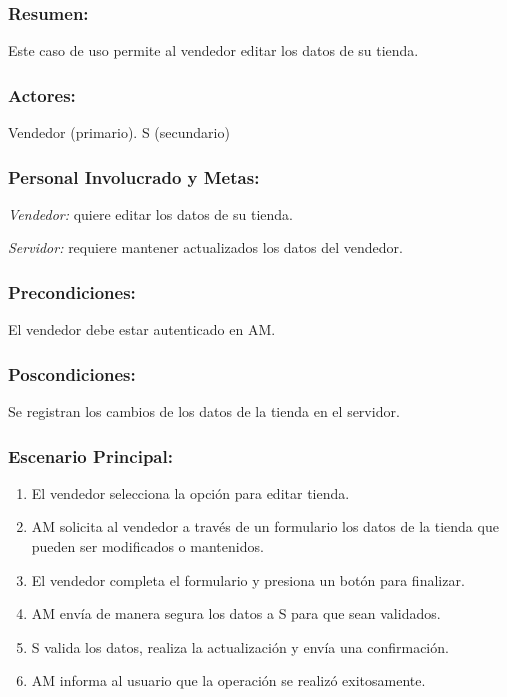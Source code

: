 \begin{framed}


\subsubsection{Resumen:} Este caso de uso permite al vendedor editar los datos de su tienda.


\subsubsection{Actores:} Vendedor (primario). S (secundario)

\subsubsection{Personal Involucrado y Metas:}

\emph{Vendedor:} quiere editar los datos de su tienda.

\emph{Servidor:} requiere mantener actualizados los datos del vendedor.

\subsubsection{Precondiciones:} 
El vendedor debe estar autenticado en AM. 

\subsubsection{Poscondiciones:} 
Se registran los cambios de los datos de la tienda en el servidor.

\subsubsection{Escenario Principal: }

\begin{enumerate}
    \item El vendedor selecciona la opción para editar tienda. 
    \item AM solicita al vendedor a través de un formulario los datos de la tienda que pueden ser modificados o mantenidos.
    \item El vendedor completa el formulario y presiona un botón para finalizar.
    \item AM envía de manera segura los datos a S para que sean validados.
    \item S valida los datos, realiza la actualización y envía una confirmación.
    \item AM informa al usuario que la operación se realizó exitosamente.
\end{enumerate}


\end{framed}
